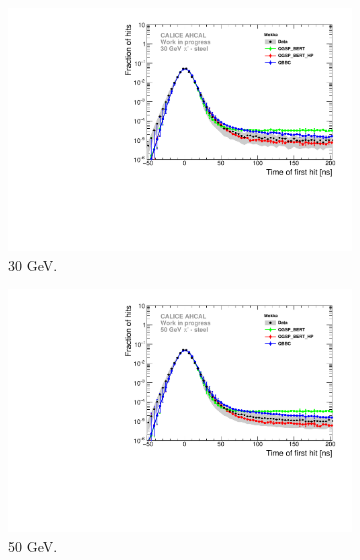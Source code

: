 \begin{figure}[htbp!]
  \begin{subfigure}[t]{0.49\textwidth}
    \centering
    \includegraphics[width=1\textwidth]{../Thesis_Plots/Timing/Pions/Plots/Comparison_SimData_Pion30GeV_LateClusters.pdf}
    \caption{30 GeV.}\label{fig:dNdt_SimData_30GeV}
  \end{subfigure}
  \begin{subfigure}[t]{0.49\textwidth}
    \centering
    \includegraphics[width=1\textwidth]{../Thesis_Plots/Timing/Pions/Plots/Comparison_SimData_Pion50GeV_LateClusters.pdf}
    \caption{50 GeV.} \label{fig:dNdt_SimData_50GeV}
  \end{subfigure}
  \hfill
  \begin{subfigure}[t]{0.49\textwidth}
    \centering

\end{subfigure}
\end{figure}
